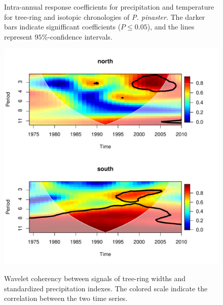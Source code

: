 \documentclass[review,authoryear]{elsarticle}
\begin{document}
\begin{landscape}
\begin{figure}
\begin{minipage}[b]{0.8\textwidth}
\end{minipage}
\label{fig:FunRes}
\caption{Intra-annual response coefficients for precipitation and
  temperature for tree-ring and isotopic chronologies of
  \textit{P. pinaster}. The darker bars indicate signifficant
  coefficients ($P\le0.05$), and the lines represent $95\%$-confidence
  intervals.}
  \end{figure}
\end{landscape}

\clearpage
\begin{figure}
\centering
\includegraphics[scale=0.7,trim=20mm 0mm 20mm 0mm]{coherence1}
\label{fig:cohe}
\caption{Wavelet coherency between signals of tree-ring widths and
  standardized precipitation indexes. The colored scale indicate the
  correlation between the two time series.}
\end{figure}



\end{document}

